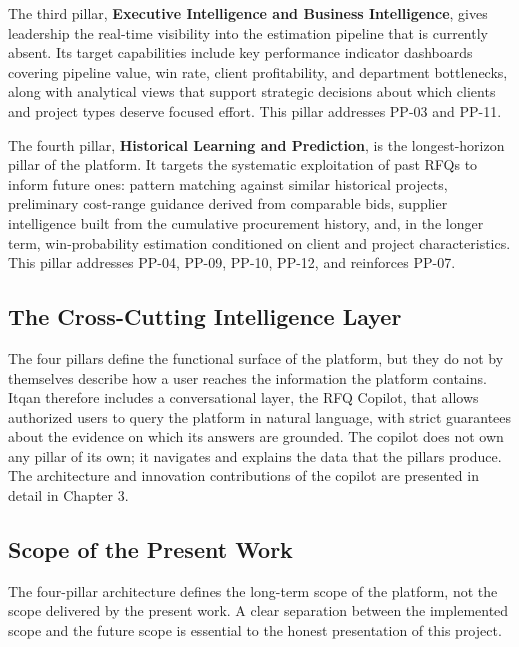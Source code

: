 The third pillar, \textbf{Executive Intelligence and Business Intelligence}, gives leadership the real-time visibility into the estimation pipeline that is currently absent. Its target capabilities include key performance indicator dashboards covering pipeline value, win rate, client profitability, and department bottlenecks, along with analytical views that support strategic decisions about which clients and project types deserve focused effort. This pillar addresses PP-03 and PP-11.

The fourth pillar, \textbf{Historical Learning and Prediction}, is the longest-horizon pillar of the platform. It targets the systematic exploitation of past RFQs to inform future ones: pattern matching against similar historical projects, preliminary cost-range guidance derived from comparable bids, supplier intelligence built from the cumulative procurement history, and, in the longer term, win-probability estimation conditioned on client and project characteristics. This pillar addresses PP-04, PP-09, PP-10, PP-12, and reinforces PP-07.

\subsection*{The Cross-Cutting Intelligence Layer}
The four pillars define the functional surface of the platform, but they do not by themselves describe how a user reaches the information the platform contains. Itqan therefore includes a conversational layer, the RFQ Copilot, that allows authorized users to query the platform in natural language, with strict guarantees about the evidence on which its answers are grounded. The copilot does not own any pillar of its own; it navigates and explains the data that the pillars produce. The architecture and innovation contributions of the copilot are presented in detail in Chapter 3.

\subsection*{Scope of the Present Work}
The four-pillar architecture defines the long-term scope of the platform, not the scope delivered by the present work. A clear separation between the implemented scope and the future scope is essential to the honest presentation of this project.

